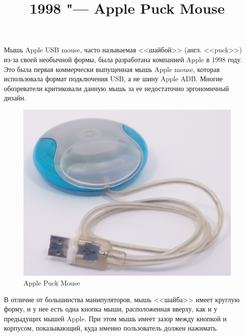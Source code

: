 \documentclass[11pt, a4paper]{article}
\begin{document}
\title{1998 "--- Apple Puck Mouse}
\date{}
\maketitle
Мышь Apple USB mouse, часто называемая <<шайбой>> (англ. <<puck>>)  из-за своей необычной формы, была разработана компанией Apple в 1998 году. Это была первая коммерчески выпущенная мышь Apple mouse, которая использовала формат подключения USB, а не шину Apple ADB. Многие обозреватели критиковали данную мышь за ее недостаточно эргономичный дизайн.

\begin{figure}[h]
    \centering
    \includegraphics[scale=0.3]{1998_apple_puck/apple.jpg}
    \caption{Apple Puck Mouse}
    \label{fig:pic}
\end{figure}

В отличие от большинства манипуляторов, мышь <<шайба>> имеет круглую форму, и у нее есть одна кнопка мыши, расположенная вверху, как и у предыдущих мышей Apple. При этом мышь имеет зазор между кнопкой и корпусом, показывающий, куда именно пользователь должен нажимать.
\end{document}
